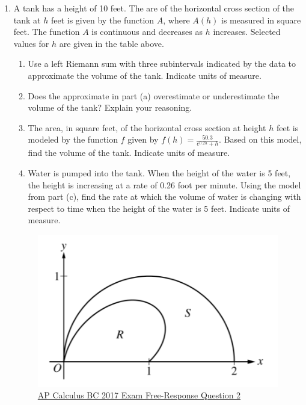 \begin{enumerate}
	
	\item A tank has a height of 10 feet.
		The are of the horizontal cross section of the tank at $h$ feet is given by the function $A$, where $A(h)$ is measured in square feet.
		The function $A$ is continuous and decreases as $h$ increases.
		Selected values for $h$ are given in the table above.
		\begin{enumerate}
			\item Use a left Riemann sum with three subintervals indicated by the data to approximate the volume of the tank.
				Indicate units of measure.
			\item Does the approximate in part (a) overestimate or underestimate the volume of the tank?
				Explain your reasoning.
			\item The area, in square feet, of the horizontal cross section at height $h$ feet is modeled by the function $f$ given by $f(h)=\frac{50.3}{e^{0.2h}+h}$.
				Based on this model, find the volume of the tank.
				Indicate units of measure.
			\item Water is pumped into the tank.
				When the height of the water is 5 feet, the height is increasing at a rate of 0.26 foot per minute.
				Using the model from part (c), find the rate at which the volume of water is changing with respect to time when the height of the water is 5 feet.
				Indicate units of measure.
		\end{enumerate}
	
	\begin{figure}[H]
		\label{2017_2}
		\centering
		\includegraphics{./additional_materials/2017_2.png}
		\caption{\hyperref{https://apcentral.collegeboard.org/pdf/ap-calculus-bc-frq-2017.pdf}{}{}{AP Calculus BC 2017 Exam Free-Response Question 2}}
	\end{figure}


\end{enumerate}
